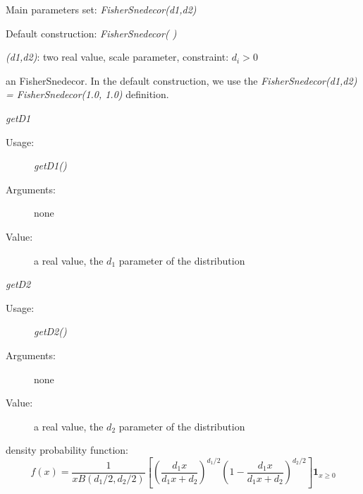 \begin{description}

\item[Usage:]
\begin{description}
\item Main parameters set: \textit{FisherSnedecor(d1,d2)}
\item Default construction: \textit{FisherSnedecor( )}
\end{description}

\item[Arguments:]  \rule{0pt}{1em}
\begin{description}
\item \textit{(d1,d2)}: two  real value, scale parameter, constraint: $d_i > 0 $
\end{description}

\item[Value:] an FisherSnedecor. In the default construction, we use the \textit{FisherSnedecor(d1,d2) = FisherSnedecor(1.0, 1.0)} definition.

\item[Some methods:]  \rule{0pt}{1em}
\begin{description}

\item \textit{getD1}
\begin{description}
\item[Usage:] \textit{getD1()}
\item[Arguments:] none
\item[Value:]  a real value, the $d_1$ parameter of the  distribution
\end{description}
\bigskip

\item \textit{getD2}
\begin{description}
\item[Usage:] \textit{getD2()}
\item[Arguments:] none
\item[Value:]  a real value, the $d_2$ parameter of the  distribution
\end{description}
\bigskip

\end{description}

\item[Details:]  \rule{0pt}{1em}
\begin{description}
\item density probability function:
\begin{equation}
f(x) = \displaystyle \frac{1}{xB(d_1/2, d_2/2)}\left[\left(\frac{d_1x}{d_1x+d_2}\right)^{d_1/2} \left(1-\frac{d_1x}{d_1x+d_2}\right)^{d_2/2} \right]\mathbf{1}_{x \geq 0}
\end{equation}
\end{description}

\item[Links:]  \rule{0pt}{1em}
\end{description}

